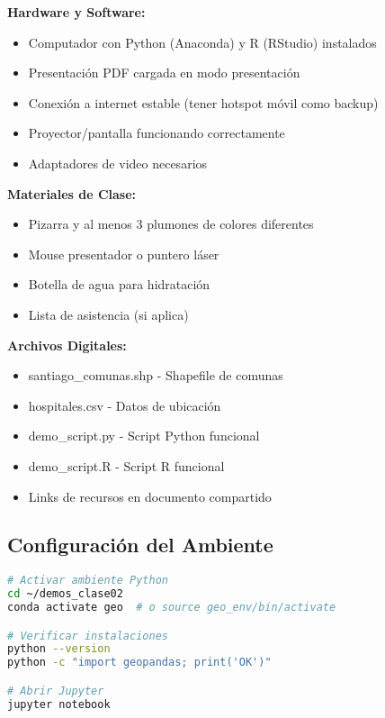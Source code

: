 \documentclass[11pt,a4paper]{article}
\begin{document}
\begin{mdframed}[backgroundcolor=gray!10]
\textbf{Hardware y Software:}
\begin{itemize}[label=$\square$]
    \item Computador con Python (Anaconda) y R (RStudio) instalados
    \item Presentación PDF cargada en modo presentación
    \item Conexión a internet estable (tener hotspot móvil como backup)
    \item Proyector/pantalla funcionando correctamente
    \item Adaptadores de video necesarios
\end{itemize}

\textbf{Materiales de Clase:}
\begin{itemize}[label=$\square$]
    \item Pizarra y al menos 3 plumones de colores diferentes
    \item Mouse presentador o puntero láser
    \item Botella de agua para hidratación
    \item Lista de asistencia (si aplica)
\end{itemize}

\textbf{Archivos Digitales:}
\begin{itemize}[label=$\square$]
    \item santiago\_comunas.shp - Shapefile de comunas
    \item hospitales.csv - Datos de ubicación
    \item demo\_script.py - Script Python funcional
    \item demo\_script.R - Script R funcional
    \item Links de recursos en documento compartido
\end{itemize}
\end{mdframed}

\subsection{Configuración del Ambiente}

\begin{lstlisting}[language=bash, caption=Terminal 1: Preparar Python]
# Activar ambiente Python
cd ~/demos_clase02
conda activate geo  # o source geo_env/bin/activate

# Verificar instalaciones
python --version
python -c "import geopandas; print('OK')"

# Abrir Jupyter
jupyter notebook
\end{lstlisting}
\end{document}
